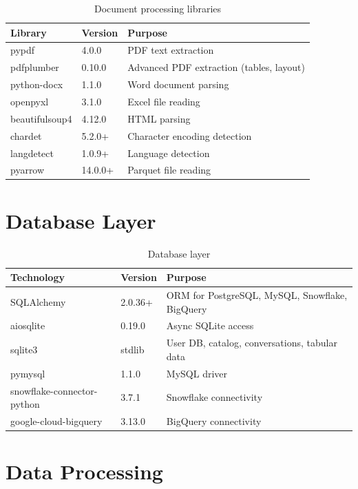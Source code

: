 \documentclass[12pt, a4paper, oneside]{report}
\begin{document}
\begin{table}[H]
\centering
{}
\begin{tabularx}{\linewidth}{llX}
\toprule
\rowcolor{rapidblue!10}
\textbf{Library} & \textbf{Version} & \textbf{Purpose} \\
\midrule
pypdf & 4.0.0 & PDF text extraction \\
pdfplumber & 0.10.0 & Advanced PDF extraction (tables, layout) \\
python-docx & 1.1.0 & Word document parsing \\
openpyxl & 3.1.0 & Excel file reading \\
beautifulsoup4 & 4.12.0 & HTML parsing \\
chardet & 5.2.0+ & Character encoding detection \\
langdetect & 1.0.9+ & Language detection \\
pyarrow & 14.0.0+ & Parquet file reading \\
\bottomrule
\end{tabularx}
\caption{Document processing libraries}
\end{table}

\section{Database Layer}

\begin{table}[H]
\centering
{}
\begin{tabularx}{\linewidth}{llX}
\toprule
\rowcolor{rapidblue!10}
\textbf{Technology} & \textbf{Version} & \textbf{Purpose} \\
\midrule
SQLAlchemy & 2.0.36+ & ORM for PostgreSQL, MySQL, Snowflake, BigQuery \\
aiosqlite & 0.19.0 & Async SQLite access \\
sqlite3 & stdlib & User DB, catalog, conversations, tabular data \\
pymysql & 1.1.0 & MySQL driver \\
snowflake-connector-python & 3.7.1 & Snowflake connectivity \\
google-cloud-bigquery & 3.13.0 & BigQuery connectivity \\
\bottomrule
\end{tabularx}
\caption{Database layer}
\end{table}

\section{Data Processing}
\end{document}
